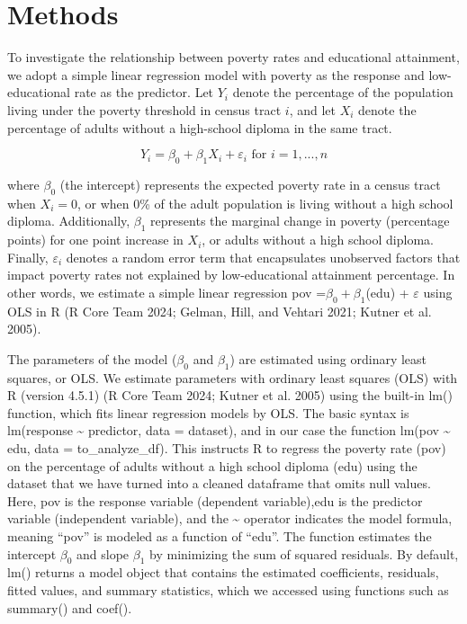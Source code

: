 \documentclass[
  letterpaper,
  DIV=11,
  numbers=noendperiod]{scrartcl}
\begin{document}
\section{Methods}\label{sec-methods}

To investigate the relationship between poverty rates and educational
attainment, we adopt a simple linear regression model with poverty as
the response and low-educational rate as the predictor. Let \(Y_i\)
denote the percentage of the population living under the poverty
threshold in census tract \(i\), and let \(X_i\) denote the percentage
of adults without a high-school diploma in the same tract.

\[Y_i = \beta_0 + \beta_1X_i + \varepsilon_i \text{ for }i=1,...,n\]

where \(\beta_0\) (the intercept) represents the expected poverty rate
in a census tract when \(X_i=0\), or when 0\% of the adult population is
living without a high school diploma. Additionally, \(\beta_1\)
represents the marginal change in poverty (percentage points) for one
point increase in \(X_i\), or adults without a high school diploma.
Finally, \(\varepsilon_i\) denotes a random error term that encapsulates
unobserved factors that impact poverty rates not explained by
low-educational attainment percentage. In other words, we estimate a
simple linear regression pov =\(\beta_0 + \beta_1\)(edu) +
\(\varepsilon\) using OLS in R (R Core Team 2024; Gelman, Hill, and
Vehtari 2021; Kutner et al. 2005).

The parameters of the model (\(\beta_0\) and \(\beta_1\)) are estimated
using ordinary least squares, or OLS. We estimate parameters with
ordinary least squares (OLS) with R (version 4.5.1) (R Core Team 2024;
Kutner et al. 2005) using the built-in lm() function, which fits linear
regression models by OLS. The basic syntax is lm(response
\textasciitilde{} predictor, data = dataset), and in our case the
function lm(pov \textasciitilde{} edu, data = to\_analyze\_df). This
instructs R to regress the poverty rate (pov) on the percentage of
adults without a high school diploma (edu) using the dataset that we
have turned into a cleaned dataframe that omits null values. Here, pov
is the response variable (dependent variable),edu is the predictor
variable (independent variable), and the \textasciitilde{} operator
indicates the model formula, meaning ``pov'' is modeled as a function of
``edu''. The function estimates the intercept \(\beta_0\) and slope
\(\beta_1\) by minimizing the sum of squared residuals. By default, lm()
returns a model object that contains the estimated coefficients,
residuals, fitted values, and summary statistics, which we accessed
using functions such as summary() and coef().
\end{document}
